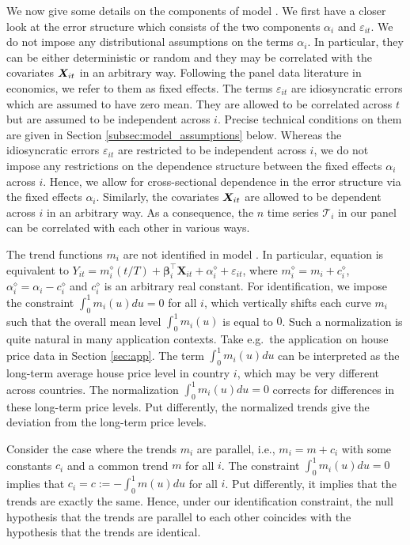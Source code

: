 \documentclass[12pt]{article}
\makeatletter
\renewcommand{\eqref}[1]{\tagform@{\ref{#1}}}
\makeatother
\begin{document}
We now give some details on the components of model \eqref{eq:model_full}. We first have a closer look at the error structure which consists of the two components $\alpha_i$ and $\varepsilon_{it}$. We do not impose any distributional assumptions on the terms $\alpha_i$. In particular, they can be either deterministic or random and they may be correlated with the covariates $\boldsymbol{X}_{it}$ in an arbitrary way. Following the panel data literature in economics, we refer to them as fixed effects. The terms $\varepsilon_{it}$ are idiosyncratic errors which are assumed to have zero mean. They are allowed to be correlated across $t$ but are assumed to be independent across $i$. Precise technical conditions on them are given in Section \ref{subsec:model_assumptions} below.  Whereas the idiosyncratic errors $\varepsilon_{it}$ are restricted to be independent across $i$, we do not impose any restrictions on the dependence structure between the fixed effects $\alpha_i$ across $i$. Hence, we allow for cross-sectional dependence in the error structure via the fixed effects $\alpha_i$. Similarly, the covariates $\boldsymbol{X}_{it}$ are allowed to be dependent across $i$ in an arbitrary way. As a consequence, the $n$ time series $\mathcal{T}_i$ in our panel can be correlated with each other in various ways.  


The trend functions $m_i$ are not identified in model \eqref{eq:model_full}. In particular, equation \eqref{eq:model_full} is equivalent to $Y_{it} = m_i^\diamond(t/T) + \boldsymbol{\beta}_i^\top \boldsymbol{X}_{it} + \alpha_i^\diamond + \varepsilon_{it}$, where $m_i^\diamond = m_i + c_i^\diamond$, $\alpha_i^\diamond = \alpha_i - c_i^\diamond$ and $c_i^\diamond$ is an arbitrary real constant. 
For identification, we impose the constraint $\int_0^1 m_i(u) du = 0$ for all $i$, which vertically shifts each curve $m_i$ such that the overall mean level $\int_0^1 m_i(u)$ is equal to $0$. Such a normalization is quite natural in many application contexts. Take e.g.\ the application on house price data in Section \ref{sec:app}. The term $\int_0^1 m_i(u) du$ can be interpreted as the long-term average house price level in country $i$, which may be very different across countries. The normalization $\int_0^1 m_i(u) du = 0$ corrects for differences in these long-term price levels. Put differently, the normalized trends give the deviation from the long-term price levels. 


Consider the case where the trends $m_i$ are parallel, i.e., $m_i = m + c_i$ with some constants $c_i$ and a common trend $m$ for all $i$. The constraint $\int_0^1 m_i(u) du = 0$ implies that $c_i = c := -\int_0^1 m(u) du$ for all $i$. Put differently, it implies that the trends are exactly the same. Hence, under our identification constraint, the null hypothesis that the trends are parallel to each other coincides with the hypothesis that the trends are identical. 
\end{document}
